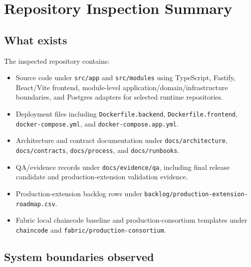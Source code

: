 \documentclass[11pt,a4paper]{article}
\newcommand{\repo}[1]{\texttt{#1}}
\begin{document}
\section{Repository Inspection Summary}

\subsection{What exists}

The inspected repository contains:

\begin{itemize}
  \item Source code under \repo{src/app} and \repo{src/modules} using TypeScript, Fastify, React/Vite frontend, module-level application/domain/infrastructure boundaries, and Postgres adapters for selected runtime repositories.
  \item Deployment files including \repo{Dockerfile.backend}, \repo{Dockerfile.frontend}, \repo{docker-compose.yml}, and \repo{docker-compose.app.yml}.
  \item Architecture and contract documentation under \repo{docs/architecture}, \repo{docs/contracts}, \repo{docs/process}, and \repo{docs/runbooks}.
  \item QA/evidence records under \repo{docs/evidence/qa}, including final release candidate and production-extension validation evidence.
  \item Production-extension backlog rows under \repo{backlog/production-extension-roadmap.csv}.
  \item Fabric local chaincode baseline and production-consortium templates under \repo{chaincode} and \repo{fabric/production-consortium}.
\end{itemize}

\subsection{System boundaries observed}
\end{document}

